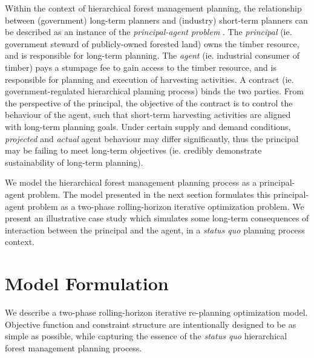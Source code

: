 Within the context of hierarchical forest management planning, the
relationship between (government) long-term planners and (industry)
short-term planners can be described as an instance of the
\emph{principal-agent problem}
\citep{bogle2012why,gray2002forest}. The \emph{principal
}(ie. government steward of publicly-owned forested land) owns the
timber resource, and is responsible for long-term planning. The
\emph{agent }(ie. industrial consumer of timber) pays a stumpage fee
to gain access to the timber resource, and is responsible for planning
and execution of harvesting activities. A contract
(ie. government-regulated hierarchical planning process) binds the two
parties. From the perspective of the principal, the objective of the
contract is to control the behaviour of the agent, such that
short-term harvesting activities are aligned with long-term planning
goals. Under certain supply and demand conditions, \emph{projected}
and \emph{actual} agent behaviour may differ significantly, thus the
principal may be failing to meet long-term objectives (ie. credibly
demonstrate sustainability of long-term planning).

We model the hierarchical forest management planning process as a
principal-agent problem. The model presented in the next section formulates this
principal-agent problem as a two-phase rolling-horizon iterative
optimization problem. We present an illustrative case study which
simulates some long-term consequences of interaction between the
principal and the agent, in a \emph{status quo} planning
process context. 


\section{Model Formulation}
\label{sec:model}

We describe a two-phase rolling-horizon iterative re-planning
optimization model. Objective function and constraint structure are
intentionally designed to be as simple as possible, while capturing
the essence of the \emph{status quo} hierarchical forest management
planning process.

